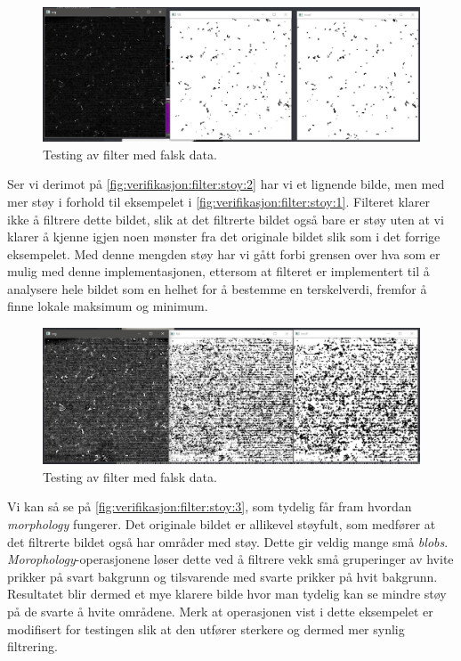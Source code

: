\begin{figure}[H]
    \centering
    \includegraphics[width=.5\textwidth]{verifikasjon-test/Filtrering/stoy_filt1.JPG}
    \caption{Testing av filter med falsk data.}
    \label{fig:verifikasjon:filter:stoy:1}
\end{figure}

Ser vi derimot på \autoref{fig:verifikasjon:filter:stoy:2} har vi et lignende bilde, men med mer støy i forhold til eksempelet i \autoref{fig:verifikasjon:filter:stoy:1}. 
Filteret klarer ikke å filtrere dette bildet, slik at det filtrerte bildet også bare er støy uten at vi klarer å kjenne igjen noen mønster fra det originale bildet slik som i det forrige eksempelet. 
Med denne mengden støy har vi gått forbi grensen over hva som er mulig med denne implementasjonen, ettersom at filteret er implementert til å analysere hele bildet som en helhet for å bestemme en terskelverdi, fremfor å finne lokale maksimum og minimum.

\begin{figure}[H]
    \centering
    \includegraphics[width=.5\textwidth]{verifikasjon-test/Filtrering/stoy_filt8.JPG}
    \caption{Testing av filter med falsk data.}
    \label{fig:verifikasjon:filter:stoy:2}
\end{figure}

Vi kan så se på \autoref{fig:verifikasjon:filter:stoy:3}, som tydelig får fram hvordan \textit{morphology} fungerer.
Det originale bildet er allikevel støyfult, som medfører at det filtrerte bildet også har områder med støy. 
Dette gir veldig mange små \textit{blobs}. 
\textit{Morophology}-operasjonene løser dette ved å filtrere vekk små gruperinger av hvite prikker på svart bakgrunn og tilsvarende med svarte prikker på hvit bakgrunn.
Resultatet blir dermed et mye klarere bilde hvor man tydelig kan se mindre støy på de svarte å hvite områdene.
Merk at operasjonen vist i dette eksempelet er modifisert for testingen slik at den utfører sterkere og dermed mer synlig filtrering.

